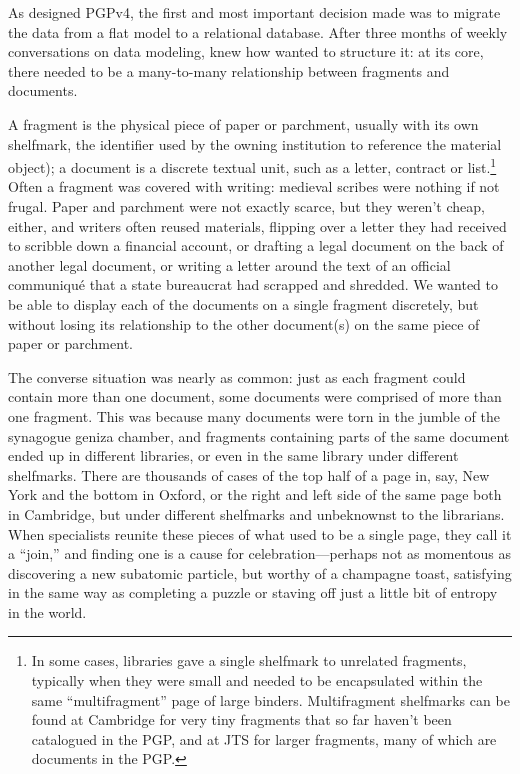 \documentclass{article}
\begin{document}
As  designed PGPv4, the first and most important decision  made was to migrate the data from a flat model to a relational database. After three months of weekly conversations on data modeling,  knew how  wanted to structure it: at its core, there needed to be a many-to-many relationship between fragments and documents. 

A fragment is the physical piece of paper or parchment, usually with its own shelfmark, the identifier used by the owning institution to reference the material object); a document is a discrete textual unit, such as a letter, contract or list.\footnote{In some cases, libraries gave a single shelfmark to unrelated fragments, typically when they were small and needed to be encapsulated within the same “multifragment” page of large binders. Multifragment shelfmarks can be found at Cambridge for very tiny fragments that so far haven’t been catalogued in the PGP, and at JTS for larger fragments, many of which are documents in the PGP.} Often a fragment was covered with writing: medieval scribes were nothing if not frugal. Paper and parchment were not exactly scarce, but they weren’t cheap, either, and writers often reused materials, flipping over a letter they had received to scribble down a financial account, or drafting a legal document on the back of another legal document, or writing a letter around the text of an official communiqué that a state bureaucrat had scrapped and shredded. We wanted to be able to display each of the documents on a single fragment discretely, but without losing its relationship to the other document(s) on the same piece of paper or parchment. 

The converse situation was nearly as common: just as each fragment could contain more than one document, some documents were comprised of more than one fragment. This was because many documents were torn in the jumble of the synagogue geniza chamber, and fragments containing parts of the same document ended up in different libraries, or even in the same library under different shelfmarks. There are thousands of cases of the top half of a page in, say, New York and the bottom in Oxford, or the right and left side of the same page both in Cambridge, but under different shelfmarks and unbeknownst to the librarians. When specialists reunite these pieces of what used to be a single page, they call it a “join,” and finding one is a cause for celebration—perhaps not as momentous as discovering a new subatomic particle, but worthy of a champagne toast, satisfying in the same way as completing a puzzle or staving off just a little bit of entropy in the world. 
\end{document}
